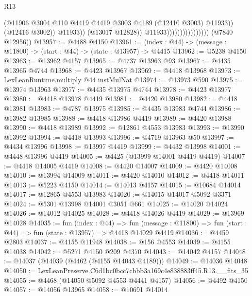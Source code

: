 \begin{lexlean}{R13}
\begin{coremodule}
                                                (@11906
                                                  @3004
                                                  @110
                                                  @4419
                                                  @4419
                                                  @3003
                                                  @4189
                                                  (@12410 @3003)
                                                  @11933))
                                              (@12416 @3002))
                                            @11933))
                                        (@13017 @12828))
                                      @11933))))))))))))))))
      (@7840 @12956))
@13957 := @4488 @4150
@13961 := (index : @44) -> (message : @11800) -> (start : @44) -> (state : @13957) -> @4415
@13962 := @5238 @4150
@13963 := @13962 @4157
@13965 := @4737 @13963 @93
@13967 := @4435 @13965 @4744
@13968 := @4423 @13967
@13969 := @4418 @13968
@13973 := LexLeanRuntime.multiply @44 instMulNat
@13974 := @13973 @590
@13975 := @13974 @13963
@13977 := @4435 @13975 @4744
@13978 := @4423 @13977
@13980 := @4418 @13978 @4419
@13981 := @4420 @13980
@13982 := @4418 @13981
@13983 := @4787 @13975
@13985 := @4435 @13983 @4744
@13986 := @13982 @13985
@13988 := @4418 @13986 @4419
@13989 := @4420 @13988
@13990 := @4418 @13989
@13992 := @12861 @4553 @13983
@13993 := @13990 @13992
@13994 := @4418 @13993
@13996 := @4719 @13963 @50
@13997 := @4434 @13996
@13998 := @13997 @4419
@13999 := @4432 @13998
@14001 := @4448 @13996 @4419
@14005 := @4425 (@13999 @14001 @4419 @4419)
@14007 := @4418 @14005 @4419
@14008 := @4420 @14007
@14009 := @4420 @14008
@14010 := @13994 @14009
@14011 := @4420 @14010
@14012 := @4418 @14011
@14013 := @5223 @4150
@14014 := @14013 @4157
@14015 := @10684 @14014
@14017 := @12865 @4553 @13983
@14020 := @14015 @14017 @5092 @3371
@14024 := @5301 @13998 @14001 @3051 @661
@14025 := @14020 @14024
@14026 := @14012 @14025
@14028 := @4418 @14026 @4419
@14029 := @13969 @14028
@14035 := fun (index : @44) =>
  fun (message : @11800) => fun (start : @44) => fun (state : @13957) => @4418 @14029 @4419
@14036 := @4459 @2803
@14037 := @4155 @11948
@14038 := @156 @4553
@14039 := @4155 @14038
@14042 := @5271 @4150 @209 @4370
@14043 := @14042 @4157
@14048 := @14037 (@14039 (@4462 (@4155 @14043 @4189)))
@14049 := @14036 @14048
@14050 := LexLeanPreserve.C6d1bc0bcc7cbbb3a169c4e838883ff45.R13.__fits_35
@14055 := @4468 (@14050 @5092 @4553 @4441 @4157)
@14056 := @4492 @4150
@14057 := @14056 @13965
@14058 := @10691 @14014

\end{coremodule}
\end{lexlean}
